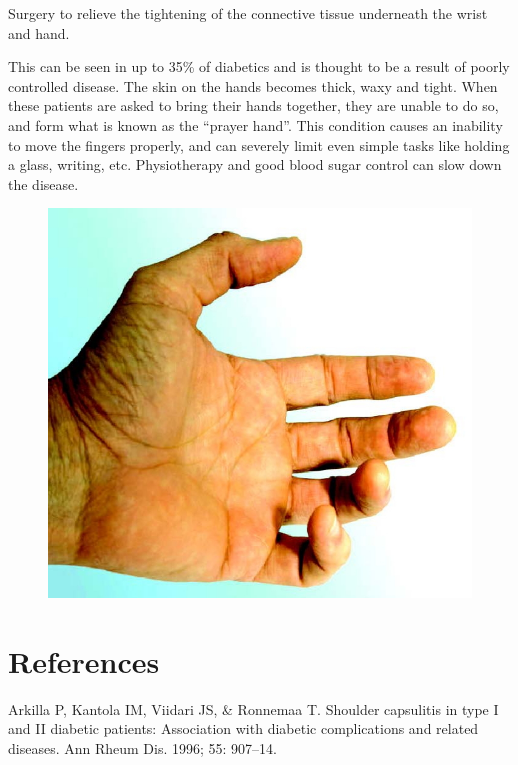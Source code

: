 { \item Surgery to relieve the tightening of the connective tissue underneath the wrist and hand.


This can be seen in up to 35\% of diabetics and is thought to be a result of poorly controlled disease. The skin on the hands becomes thick, waxy and tight. When these patients are asked to bring their hands together, they are unable to do so, and form what is known as the “prayer hand”. This condition causes an inability to move the fingers properly, and can severely limit even simple tasks like holding a glass, writing, etc. Physiotherapy and good blood sugar control can slow down the disease.

\begin{figure}
\includegraphics{images/075.jpg}
\end{figure}


\section*{References}

\begin{thebibliography}{99}
 Arkilla P, Kantola IM, Viidari JS, \& Ronnemaa T. Shoulder capsulitis in type I and II diabetic patients: Association with diabetic complications and related diseases. Ann Rheum Dis. 1996; 55: 907–14.


\end{thebibliography}}
